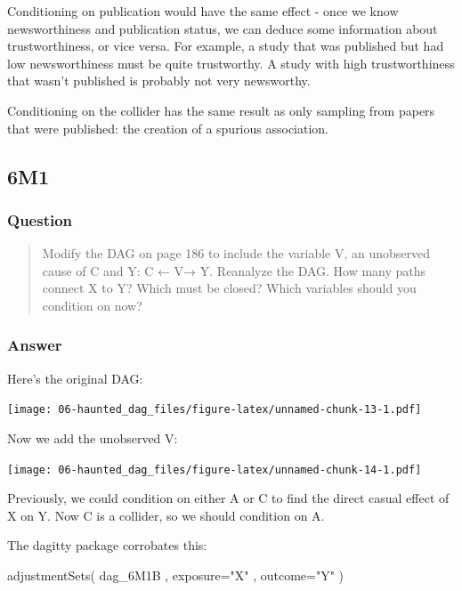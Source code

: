 \documentclass[
]{book}
\newenvironment{Shaded}{\begin{snugshade}}{\end{snugshade}}
\newcommand{\AttributeTok}[1]{\textcolor[rgb]{0.77,0.63,0.00}{#1}}
\newcommand{\FunctionTok}[1]{\textcolor[rgb]{0.00,0.00,0.00}{#1}}
\newcommand{\NormalTok}[1]{#1}
\newcommand{\StringTok}[1]{\textcolor[rgb]{0.31,0.60,0.02}{#1}}
\begin{document}
Conditioning on publication would have the same effect - once we know newsworthiness and publication status, we can deduce some information about trustworthiness, or vice versa. For example, a study that was published but had low newsworthiness must be quite trustworthy. A study with high trustworthiness that wasn't published is probably not very newsworthy.

Conditioning on the collider has the same result as only sampling from papers that were published: the creation of a spurious association.

\hypertarget{m1-3}{%
\subsection*{6M1}\label{m1-3}}

\hypertarget{question-52}{%
\subsubsection*{Question}\label{question-52}}

\begin{quote}
Modify the DAG on page 186 to include the variable V, an unobserved cause of C and Y: C ← V→ Y. Reanalyze the DAG. How many paths connect X to Y? Which must be closed? Which variables should you condition on now?
\end{quote}

\hypertarget{answer-52}{%
\subsubsection*{Answer}\label{answer-52}}

Here's the original DAG:

\texttt{[image: 06-haunted\_dag\_files/figure-latex/unnamed-chunk-13-1.pdf]}

Now we add the unobserved V:

\texttt{[image: 06-haunted\_dag\_files/figure-latex/unnamed-chunk-14-1.pdf]}

Previously, we could condition on either A or C to find the direct casual effect of X on Y. Now C is a collider, so we should condition on A.

The dagitty package corrobates this:

\begin{Shaded}
\begin{Highlighting}[]
\FunctionTok{adjustmentSets}\NormalTok{( dag\_6M1B , }\AttributeTok{exposure=}\StringTok{"X"}\NormalTok{ , }\AttributeTok{outcome=}\StringTok{"Y"}\NormalTok{ )}
\end{Highlighting}
\end{Shaded}
\end{document}
